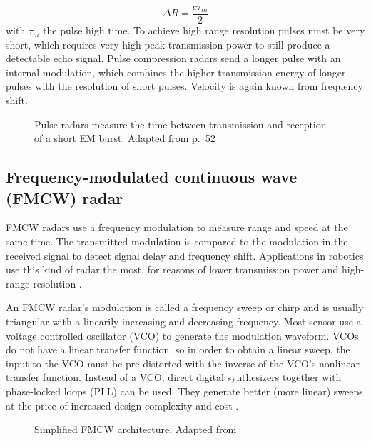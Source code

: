 \begin{equation} \label{eq:tof_res}
	\Delta R = \frac{c\tau_m}{2}
\end{equation}
with \(\tau_m\) the pulse high time. To
achieve high range resolution pulses must be very short, which requires
very high peak transmission power to still produce a detectable echo
signal. Pulse compression radars send a longer pulse with an internal
modulation, which combines the higher transmission energy of longer
pulses with the resolution of short pulses. Velocity is again known from
frequency shift.

\begin{figure}[htp]
    \centering
    \def\svgwidth{10cm}
    
    \caption{\label{fig:radar_pulse}Pulse radars measure the time between transmission and reception of a short EM burst. Adapted from \cite{Adams2012} p.~52}
\end{figure}


\subsection{Frequency-modulated continuous wave (FMCW) radar}\label{frequency-modulated-continuous-wave-fmcw-radar}

FMCW radars use a frequency modulation to measure range and speed at the
same time. The transmitted modulation is compared to the modulation in
the received signal to detect signal delay and frequency shift.
Applications in robotics use this kind of radar the most, for reasons of
lower transmission power and high-range resolution \cite{Adams2012}.

An FMCW radar's modulation is called a frequency sweep or chirp and is
usually triangular with a linearily increasing and decreasing frequency.
Most sensor use a voltage controlled oscillator (VCO) to generate the
modulation waveform. VCOs do not have a linear transfer function, so in
order to obtain a linear sweep, the input to the VCO must be
pre-distorted with the inverse of the VCO's nonlinear transfer function.
Instead of a VCO, direct digital synthesizers together with phase-locked
loops (PLL) can be used. They generate better (more linear) sweeps at
the price of increased design complexity and cost \cite{Ernst2016}.

\begin{figure}[htp]
    \centering
    \def\svgwidth{\linewidth}
    
    \caption{\label{fig:fmcw_blocks}Simplified FMCW architecture. Adapted from \cite{VanZeijl2014}}
\end{figure}

